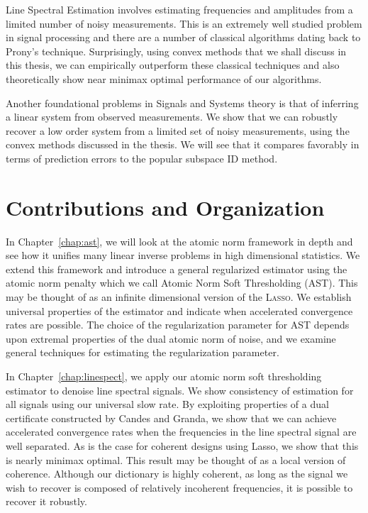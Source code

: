Line Spectral Estimation involves estimating frequencies and amplitudes from a
limited number of noisy measurements. This is an extremely well studied problem
in signal processing and there are a number of classical algorithms dating back
to Prony's technique. Surprisingly, using convex methods that we shall discuss
in this thesis, we can empirically outperform these classical techniques and
also theoretically show near minimax optimal performance of our algorithms.

Another foundational problems in Signals and Systems theory is that of inferring
a linear system from observed measurements. We show that we can robustly recover
a low order system from a limited set of noisy measurements, using the convex
methods discussed in the thesis. We will see that it compares favorably in terms
of prediction errors to the popular subspace ID method.

\section*{Contributions and Organization} %
\label{sec:contributions}

In Chapter~\ref{chap:ast}, we will look at the atomic norm framework in depth
and see how it unifies many linear inverse problems in high dimensional
statistics. We extend this framework and introduce a general regularized
estimator using the atomic norm penalty which we call Atomic Norm Soft
Thresholding (AST). This may be thought of as an infinite dimensional version of
the \textsc{Lasso}. We establish universal properties of the estimator and
indicate when accelerated convergence rates are possible. The choice of the
regularization parameter for AST depends upon extremal properties of the dual
atomic norm of noise, and we examine general techniques for estimating the
regularization parameter.

In Chapter~\ref{chap:linespect}, we apply our atomic norm soft thresholding
estimator to denoise line spectral signals. We show consistency of estimation
for all signals using our universal slow rate. By exploiting properties of a
dual certificate constructed by Candes and Granda, we show that we can achieve
accelerated convergence rates when the frequencies in the line spectral signal
are well separated. As is the case for coherent designs using Lasso, we show
that this is nearly minimax optimal. This result may be thought of as a local
version of coherence. Although our dictionary is highly coherent, as long as the
signal we wish to recover is composed of relatively incoherent frequencies, it
is possible to recover it robustly. 

